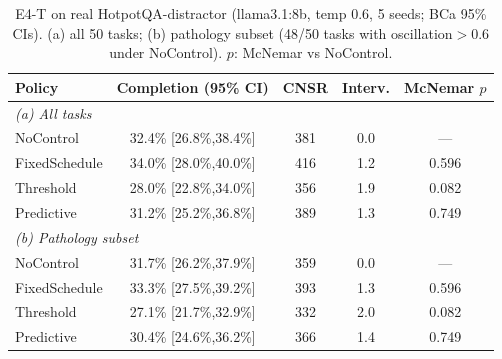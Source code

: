 \begin{table}[t]
\centering
\caption{E4-T on real HotpotQA-distractor (llama3.1:8b, temp 0.6, 5 seeds; BCa 95\% CIs). (a) all 50 tasks; (b) pathology subset (48/50 tasks with oscillation$>$0.6 under NoControl). $p$: McNemar vs NoControl.}
\label{tab:e4t_ollama}
\begin{tabular}{lcccc}
\toprule
Policy & Completion (95\% CI) & CNSR & Interv. & McNemar $p$ \\
\midrule
\multicolumn{5}{l}{\textit{(a) All tasks}} \\
NoControl & 32.4\% [26.8\%,38.4\%] & 381 & 0.0 & — \\
FixedSchedule & 34.0\% [28.0\%,40.0\%] & 416 & 1.2 & 0.596 \\
Threshold & 28.0\% [22.8\%,34.0\%] & 356 & 1.9 & 0.082 \\
Predictive & 31.2\% [25.2\%,36.8\%] & 389 & 1.3 & 0.749 \\
\midrule
\multicolumn{5}{l}{\textit{(b) Pathology subset}} \\
NoControl & 31.7\% [26.2\%,37.9\%] & 359 & 0.0 & — \\
FixedSchedule & 33.3\% [27.5\%,39.2\%] & 393 & 1.3 & 0.596 \\
Threshold & 27.1\% [21.7\%,32.9\%] & 332 & 2.0 & 0.082 \\
Predictive & 30.4\% [24.6\%,36.2\%] & 366 & 1.4 & 0.749 \\
\bottomrule
\end{tabular}
\end{table}
